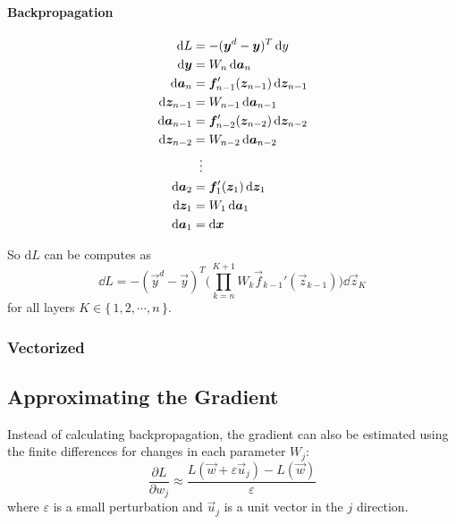 		\paragraph{Backpropagation} %
			\begin{align}
				\dd{L}               & = -(\bm{y}^d - \bm{y})^T \dd{y}                         \\
				\dd{\bm{y}}         & = W_n \dd{\bm{a}_n}                                      \\
				\dd{\bm{a}_n}       & = \bm{f}_{n - 1}' (\bm{z}_{n - 1}) \dd{\bm{z}_{n - 1}} \\
				\dd{\bm{z}_{n - 1}} & = W_{n - 1} \dd{\bm{a}_{n - 1}}                          \\
				\dd{\bm{a}_{n - 1}} & = \bm{f}_{n - 2}' (\bm{z}_{n - 2}) \dd{\bm{z}_{n - 2}} \\
				\dd{\bm{z}_{n - 2}} & = W_{n - 2} \dd{\bm{a}_{n - 2}}                          \\
				                     & \hspace{0.2cm}\vdots                                      \\
				\dd{\bm{a}_2}       & = \bm{f}_1' (\bm{z}_1) \dd{\bm{z}_1}                   \\
				\dd{\bm{z}_1}       & = W_1 \dd{\bm{a}_1}                                      \\
				\dd{\bm{a}_1}       & = \textrm{d}\bm{x}
			\end{align}

			So \( \textrm{d}L \) can be computes as
			\begin{equation}
				\dd{L} = -(\vec{y}^d - \vec{y})^T \Bigg( \prod_{k = n}^{K + 1} W_k \vec{f}_{k - 1}' (\vec{z}_{k - 1}) \Bigg) \dd{\vec{z}_K}
			\end{equation}
			for all layers \( K \in \{\, 1, 2, \cdots, n \,\} \).

		\subsubsection{Vectorized} %

	\subsection{Approximating the Gradient}
		Instead of calculating backpropagation, the gradient can also be estimated using the finite differences for changes in each parameter \( W_j \):
		\begin{equation}
			\frac{\partial L}{\partial w_j} \approx \frac{L(\vec{w} + \varepsilon \vec{u}_j) - L(\vec{w})}{\varepsilon}
		\end{equation}
		where \(\varepsilon\) is a small perturbation and \(\vec{u}_j\) is a unit vector in the \(j\) direction.

